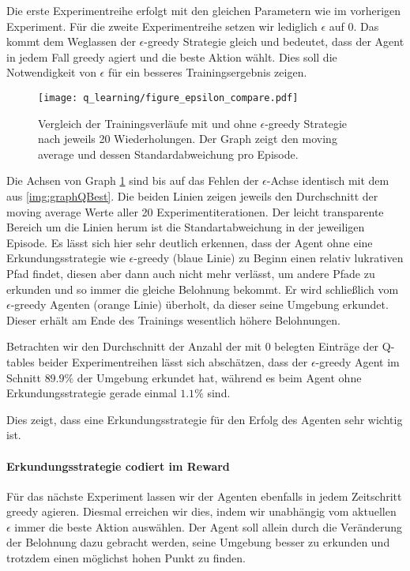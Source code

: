 Die erste Experimentreihe erfolgt mit den gleichen Parametern wie im vorherigen Experiment. Für die zweite Experimentreihe setzen wir lediglich $ \epsilon $ auf 0. Das kommt dem Weglassen der $ \epsilon $-greedy Strategie gleich und bedeutet, dass der Agent in jedem Fall greedy agiert und die beste Aktion wählt. Dies soll die Notwendigkeit von $ \epsilon $ für ein besseres Trainingsergebnis zeigen.
\begin{figure}[H]
    \centering
    \texttt{[image: q\_learning/figure\_epsilon\_compare.pdf]}
    \caption{Vergleich der Trainingsverläufe mit und ohne $ \epsilon $-greedy Strategie nach jeweils 20 Wiederholungen. Der Graph zeigt den moving average und dessen Standardabweichung pro Episode.} \label{img:graphQEpsComp}
\end{figure}
Die Achsen von Graph \ref{img:graphQEpsComp} sind bis auf das Fehlen der $ \epsilon $-Achse identisch mit dem aus \ref{img:graphQBest}. Die beiden Linien zeigen jeweils den Durchschnitt der moving average Werte aller 20 Experimentiterationen. Der leicht transparente Bereich um die Linien herum ist die Standartabweichung in der jeweiligen Episode.
Es lässt sich hier sehr deutlich erkennen, dass der Agent ohne eine Erkundungsstrategie wie $ \epsilon $-greedy (blaue Linie) zu Beginn einen relativ lukrativen Pfad findet, diesen aber dann auch nicht mehr verlässt, um andere Pfade zu erkunden und so immer die gleiche Belohnung bekommt. Er wird schließlich vom $ \epsilon $-greedy Agenten (orange Linie) überholt, da dieser seine Umgebung erkundet. Dieser erhält am Ende des Trainings wesentlich höhere Belohnungen.

Betrachten wir den Durchschnitt der Anzahl der mit 0 belegten Einträge der Q-tables beider Experimentreihen lässt sich abschätzen, dass der $ \epsilon $-greedy Agent im Schnitt $ 89.9\% $ der Umgebung erkundet hat, während es beim Agent ohne Erkundungsstrategie gerade einmal $ 1.1\% $ sind.

Dies zeigt, dass eine Erkundungsstrategie für den Erfolg des Agenten sehr wichtig ist.

\paragraph{Erkundungsstrategie codiert im Reward}
Für das nächste Experiment lassen wir der Agenten ebenfalls in jedem Zeitschritt greedy agieren. Diesmal erreichen wir dies, indem wir unabhängig vom aktuellen $ \epsilon $ immer die beste Aktion auswählen. Der Agent soll allein durch die Veränderung der Belohnung dazu gebracht werden, seine Umgebung besser zu erkunden und trotzdem einen möglichst hohen Punkt zu finden.

